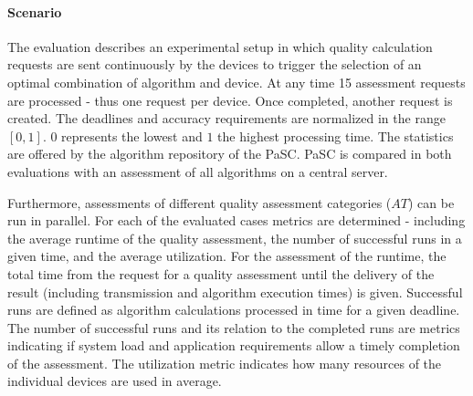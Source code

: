 \paragraph{Scenario}
The evaluation describes an experimental setup in which quality calculation requests are sent continuously by the devices to trigger the selection of an optimal combination of algorithm and device.
At any time 15 assessment requests are processed - thus one request per device. Once completed, another request is created.
The deadlines and accuracy requirements are normalized in the range $[0, 1]$. 
$0$ represents the lowest and $1$ the highest processing time.
The statistics are offered by the algorithm repository of the \ac{PaSC}. 
\ac{PaSC} is compared in both evaluations with an assessment of all algorithms on a central server.

Furthermore, assessments of different quality assessment categories ($AT$) can be run in parallel. 
For each of the evaluated cases metrics are determined - including the average runtime of the quality assessment, the number of successful runs in a given time, and the average utilization.
For the assessment of the runtime, the total time from the request for a quality assessment until the delivery of the result (including transmission and algorithm execution times) is given.
Successful runs are defined as algorithm calculations processed in time for a given deadline. 
The number of successful runs and its relation to the completed runs are metrics indicating if system load and application requirements allow a timely completion of the assessment.
The utilization metric indicates how many resources of the individual devices are used in average.
